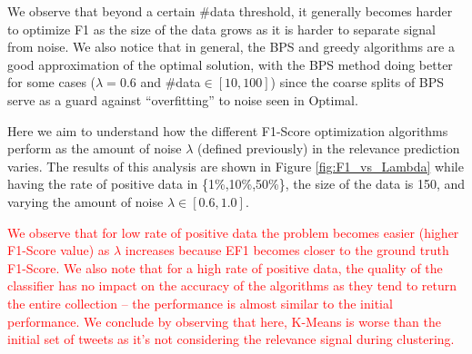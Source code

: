 We observe that beyond a certain \#data threshold, it generally becomes harder to optimize F1 as the size of the data grows as it is harder to separate signal from noise.
We also notice that in general, the BPS and greedy algorithms are a good approximation of the optimal solution, with the BPS method doing better for some cases ($\lambda=0.6$ and \#data$\in [10,100]$) since the coarse splits of BPS serve as a guard against ``overfitting'' to noise seen in Optimal.


  Here we aim to understand how the different F1-Score optimization algorithms perform as the amount of noise $\lambda$ (defined previously) in the relevance prediction varies.
The results of this analysis are shown in Figure \ref{fig:F1_vs_Lambda} while having the rate of positive data in \{1\%,10\%,50\%\}, the size of the data is 150, and varying the amount of noise $\lambda \in [0.6,1.0]$.

\textcolor{red}{We observe that for low rate of positive data the problem becomes easier (higher F1-Score value) as $\lambda$ increases because EF1 becomes closer to the ground truth F1-Score.  
We also note that for a high rate of positive data, the quality of the classifier has no impact on the accuracy of the algorithms as they tend to return the entire collection -- the performance is almost similar to the initial performance. We conclude by observing that here, K-Means is worse than the initial set of tweets as it's not considering the relevance signal during clustering. }


